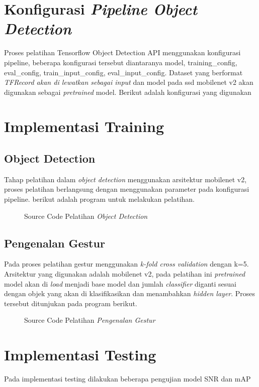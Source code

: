 \section{Konfigurasi \textit{Pipeline Object Detection}}
Proses pelatihan Tensorflow Object Detection API  menggunakan konfigurasi pipeline, beberapa konfigurasi tersebut diantaranya model, training\_config, eval\_config, train\_input\_config, eval\_input\_config. Dataset yang berformat \textit{TFRecord akan di lewatkan sebagai input} dan model pada ssd mobilenet v2 akan digunakan sebagai \textit{pretrained} model. Berikut adalah konfigurasi yang digunakan

\section{Implementasi Training}
\subsection{Object Detection}
Tahap pelatihan dalam \textit{object detection} menggunakan arsitektur mobilenet v2, proses pelatihan berlangsung dengan menggunakan parameter pada konfigurasi pipeline. berikut adalah program untuk melakukan pelatihan.
\begin{figure}[H]
	\centering
	
	\caption{Source Code Pelatihan \textit{Object Detection}}
\end{figure}
\subsection{Pengenalan Gestur}
Pada proses pelatihan gestur menggunakan \textit{k-fold cross validation} dengan k=5. Arsitektur yang digunakan adalah mobilenet v2, pada pelatihan ini \textit{pretrained} model akan di \textit{load} menjadi base model dan jumlah \textit{classifier} diganti sesuai dengan objek yang akan di klasifikasikan dan menambahkan \textit{hidden layer}. Proses tersebut ditunjukan pada program berikut.
\begin{figure}[H]
	\centering
	
	\caption{Source Code Pelatihan \textit{Pengenalan Gestur}}
\end{figure}

\section{Implementasi Testing}
Pada implementasi testing dilakukan beberapa pengujian model SNR dan mAP 